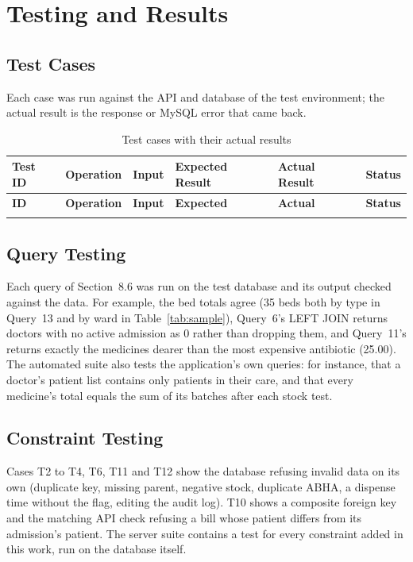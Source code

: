 \chapter{Testing and Results}

\section{Test Cases}
Each case was run against the API and database of the test environment; the actual result is the response or
MySQL error that came back.

{\scriptsize\setlength{\tabcolsep}{3pt}
\begin{longtable}{@{}R{0.55cm}R{2.2cm}R{3.6cm}R{2.3cm}R{6.9cm}R{0.6cm}@{}}
\caption{Test cases with their actual results}\label{tab:tests}\\
\toprule
\textbf{Test ID} & \textbf{Operation} & \textbf{Input} & \textbf{Expected Result} & \textbf{Actual Result} & \textbf{Status} \\\midrule\endfirsthead
\toprule\textbf{ID} & \textbf{Operation} & \textbf{Input} & \textbf{Expected} & \textbf{Actual} & \textbf{Status} \\\midrule\endhead
{}
\bottomrule
\end{longtable}}

\section{Query Testing}
Each query of Section~8.6 was run on the test database and its output checked against the data. For example, the bed
totals agree (35 beds both by type in Query~13 and by ward in Table~\ref{tab:sample}), Query~6's LEFT JOIN
returns doctors with no active admission as 0 rather than dropping them, and Query~11's  returns exactly
the medicines dearer than the most expensive antibiotic (25.00). The automated suite also tests the application's
own queries: for instance, that a doctor's patient list contains only patients in their care, and that every
medicine's total equals the sum of its batches after each stock test.

\section{Constraint Testing}
Cases T2 to T4, T6, T11 and T12 show the database refusing invalid data on its own (duplicate key, missing parent,
negative stock, duplicate ABHA, a dispense time without the flag, editing the audit log). T10 shows a composite
foreign key and the matching API check refusing a bill whose patient differs from its admission's patient.
The server suite contains a test for every constraint added in this work, run on the database itself.

